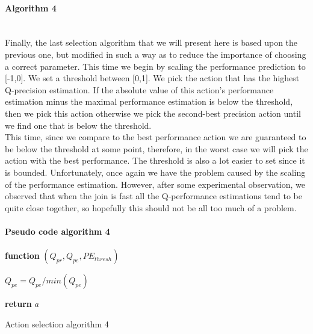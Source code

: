 \paragraph{Algorithm 4}\mbox{}\\
Finally, the last selection algorithm that we will present here is based upon the previous one, but modified in such a way as to reduce the importance of choosing a correct parameter. This time we begin by scaling the performance prediction to [-1,0]. We set a threshold between [0,1]. We pick the action that has the highest Q-precision estimation. If the absolute value of this action's performance estimation minus the maximal performance estimation is below the threshold, then we pick this action otherwise we pick the second-best precision action until we find one that is below the threshold.\\
This time, since we compare to the best performance action we are guaranteed to be below the threshold at some point, therefore, in the worst case we will pick the action with the best performance. The threshold is also a lot easier to set since it is bounded. Unfortunately, once again we have the problem caused by the scaling of the performance estimation. However, after some experimental observation, we observed that when the join is fast all the Q-performance estimations tend to be quite close together, so hopefully this should not be all too much of a problem.
\paragraph{Pseudo code algorithm 4}
\begin{center}
	\begin{algorithm}[H]

    \textbf{function}  $(Q_{pr},Q_{pe},PE_{thresh})$\;
    
    
    \Indp{}\Indm
    \Indp{} \Indm
    \Indp
    $Q_{pe} = Q_{pe}/min(Q_{pe})$\\
   
  
   \textbf{return} $a$
   
    
\caption{Action selection algorithm 4}
\end{algorithm}
\end{center}
